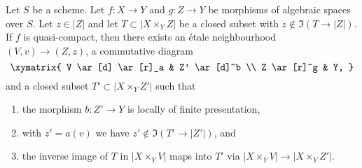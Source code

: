 \begin{lemma}
\label{lemma-separate}
Let $S$ be a scheme. Let $f : X \to Y$ and $g : Z \to Y$ be
morphisms of algebraic spaces over $S$. Let $z \in |Z|$ and let
$T \subset |X \times_Y Z|$ be a closed subset
with $z \not \in \Im(T \to |Z|)$.
If $f$ is quasi-compact, then there exists
an \'etale neighbourhood $(V, v) \to (Z, z)$,
a commutative diagram
$$
\xymatrix{
V \ar[d] \ar[r]_a & Z' \ar[d]^b \\
Z \ar[r]^g & Y,
}
$$
and a closed subset $T' \subset |X \times_Y Z'|$ such that
\begin{enumerate}
\item the morphism $b : Z' \to Y$ is locally of finite presentation,
\item with $z' = a(v)$ we have $z' \not \in \Im(T' \to |Z'|)$, and
\item the inverse image of $T$ in $|X \times_Y V|$
maps into $T'$ via $|X \times_Y V| \to |X \times_Y Z'|$.
\end{enumerate}
\end{lemma}

